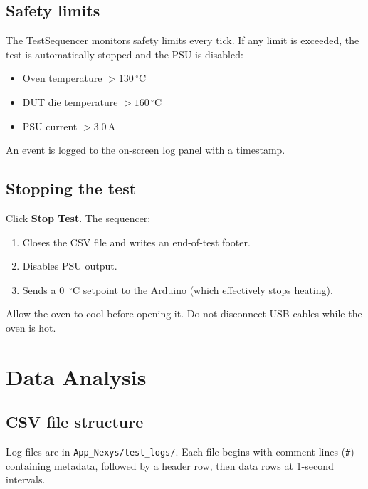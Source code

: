 \documentclass[12pt, a4paper]{report}
\begin{document}
\section{Safety limits}

The TestSequencer monitors safety limits every tick. If any limit is exceeded,
the test is automatically stopped and the PSU is disabled:

\begin{itemize}
  \item Oven temperature $> 130\,^\circ\text{C}$
  \item DUT die temperature $> 160\,^\circ\text{C}$
  \item PSU current $> 3.0\,\text{A}$
\end{itemize}

An event is logged to the on-screen log panel with a timestamp.

\section{Stopping the test}

Click \textbf{Stop Test}. The sequencer:
\begin{enumerate}
  \item Closes the CSV file and writes an end-of-test footer.
  \item Disables PSU output.
  \item Sends a 0~$^\circ$C setpoint to the Arduino (which effectively stops heating).
\end{enumerate}

Allow the oven to cool before opening it. Do not disconnect USB cables while the
oven is hot.

\chapter{Data Analysis}
\label{ch:analysis}

\section{CSV file structure}

Log files are in \texttt{App\_Nexys/test\_logs/}. Each file begins with comment
lines (\texttt{\#}) containing metadata, followed by a header row, then data rows
at 1-second intervals.
\end{document}
